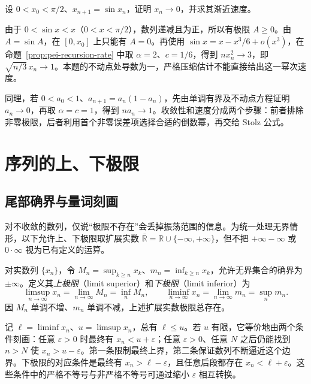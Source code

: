 \begin{example}
\label{ex:pei-sine-recursion-rate}
设 $0<x_0<\pi/2$、$x_{n+1}=\sin x_n$，证明 $x_n\to0$，并求其渐近速度。
\end{example}
\begin{solve}
由于 $0<\sin x<x$（$0<x<\pi/2$），数列递减且为正，所以有极限 $A\ge0$。由 $A=\sin A$，在 $[0,x_0]$ 上只能有 $A=0$。再使用 $\sin x=x-x^3/6+o(x^3)$，在命题~\ref{prop:pei-recursion-rate} 中取 $\alpha=2$、$c=1/6$，得到 $nx_n^2\to3$，即 $\sqrt{n/3}\,x_n\to1$。本题的不动点处导数为一，严格压缩估计不能直接给出这一幂次速度。
\end{solve}

同理，若 $0<a_0<1$、$a_{n+1}=a_n(1-a_n)$，先由单调有界及不动点方程证明 $a_n\to0$，再取 $\alpha=c=1$，得到 $na_n\to1$。收敛性和速度分成两个步骤：前者排除非零极限，后者利用首个非零误差项选择合适的倒数幂，再交给 Stolz 公式。

\section{序列的上、下极限}
\label{sec:pei-sequence-limsup}

\subsection{尾部确界与量词刻画}

对不收敛的数列，仅说“极限不存在”会丢掉振荡范围的信息。为统一处理无界情形，以下允许上、下极限取扩展实数 $\overline{\mathbb{R}}=\mathbb{R}\cup\{-\infty,+\infty\}$，但不把 $+\infty-\infty$ 或 $0\cdot\infty$ 视为已有定义的运算。

\begin{definition}
\label{def:pei-sequence-limsup}
对实数列 $\{x_n\}$，令 $M_n=\sup_{k\ge n}x_k$、$m_n=\inf_{k\ge n}x_k$，允许无界集合的确界为 $\pm\infty$。定义其\emph{上极限}（limit superior）和\emph{下极限}（limit inferior）为
\begin{equation}
    \limsup_{n\to\infty}x_n=\lim_{n\to\infty}M_n=\inf_nM_n,
    \qquad
    \liminf_{n\to\infty}x_n=\lim_{n\to\infty}m_n=\sup_nm_n.
    \label{eq:pei-tail-extrema}
\end{equation}
因 $M_n$ 单调不增、$m_n$ 单调不减，上述扩展实数极限总存在。
\end{definition}

记 $\ell=\liminf x_n$、$u=\limsup x_n$，总有 $\ell\le u$。若 $u$ 有限，它等价地由两个条件刻画：任意 $\varepsilon>0$ 时最终有 $x_n<u+\varepsilon$；任意 $\varepsilon>0$、任意 $N$ 之后仍能找到 $n>N$ 使 $x_n>u-\varepsilon$。第一条限制最终上界，第二条保证数列不断逼近这个边界。下极限的对应条件是最终有 $x_n>\ell-\varepsilon$，且任意后段都存在 $x_n<\ell+\varepsilon$。这些条件中的严格不等号与非严格不等号可通过缩小 $\varepsilon$ 相互转换。

